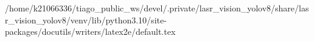 /home/k21066336/tiago_public_ws/devel/.private/lasr_vision_yolov8/share/lasr_vision_yolov8/venv/lib/python3.10/site-packages/docutils/writers/latex2e/default.tex